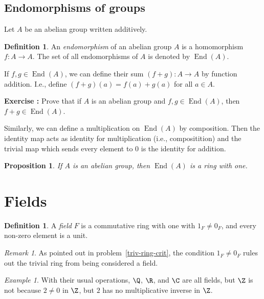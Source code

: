 \documentclass[12pt]{amsart}
\DeclareMathOperator{\End}{End}
\newcounter{probs}
\newenvironment{prob}{%
  \refstepcounter{probs}
  \par\medskip\noindent\textbf{Exercise \theprobs:} }{\par\medskip}
\theoremstyle{plain}
\newtheorem{prop}[thm]{Proposition}
\theoremstyle{definition}
\newtheorem{defn}[thm]{Definition}
\theoremstyle{remark}
\newtheorem*{remark}{Remark}
\newtheorem*{exam}{Example}
\begin{document}
\subsection{Endomorphisms of groups}
Let $A$ be an abelian group written additively.
\begin{defn}
  An \emph{endomorphism} of an abelian group $A$ is a homomorphism
  $f:A\to A$.  The set of all endomorphisms of $A$ is denoted by $\End(A)$.
\end{defn}
If $f,g\in\End(A)$, we can define their sum $(f+g):A\to A$ by function
addition.  I.e., define $(f+g)(a) = f(a)+g(a)$ for all $a\in A$.
\begin{prob}
  Prove that if $A$ is an abelian group and $f,g\in\End(A)$, then
  $f+g\in \End(A)$.
\end{prob}
Similarly, we can define a multiplication on $\End(A)$ by
composition.  Then the identity map acts as identity for
multiplication (i.e., compositition) and the trivial map which sends
every element to $0$ is the identity for addition.
\begin{prop}
  If $A$ is an abelian group, then $\End(A)$ is a ring with one.
\end{prop}

\section{Fields}

\begin{defn}
  A \emph{field} $F$ is a commutative ring with one with $1_F\neq 0_F$,
  and every non-zero element is a unit.
\end{defn}
\begin{remark}
  As pointed out in problem~\ref{triv-ring-crit}, the condition
  $1_F\neq 0_F$ rules out the trivial ring from being considered a
  field.
\end{remark}

\begin{exam}
  With their usual operations, $\Q$, $\R$, and $\C$ are all fields,
  but $\Z$ is not because $2\neq 0$ in $\Z$, but $2$ has no
  multiplicative inverse in $\Z$.
\end{exam}
\end{document}
